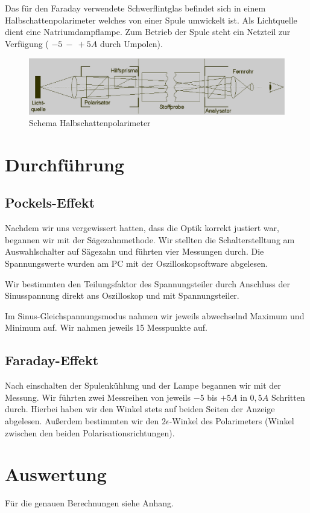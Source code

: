\documentclass[12pt]{article}
\begin{document}
Das für den Faraday verwendete Schwerflintglas befindet sich in einem Halbschattenpolarimeter welches von einer Spule umwickelt ist. Als Lichtquelle dient eine Natriumdampflampe. Zum Betrieb der Spule steht ein Netzteil zur Verfügung ( $-5~-~+5A$ durch Umpolen).

\begin{figure}[H]
\centering
\includegraphics[width=1\linewidth]{pictures/halbschattenpolarimeter.eps}
\caption{Schema Halbschattenpolarimeter}
\end{figure}


\section{Durchführung}
\subsection{Pockels-Effekt}
Nachdem wir uns vergewissert hatten, dass die Optik korrekt justiert war, begannen wir mit der Sägezahnmethode.
Wir stellten die Schalterstelltung am Auswahlschalter auf Sägezahn und führten vier Messungen durch. Die Spannungswerte wurden am PC mit der Oszilloskopsoftware abgelesen.

Wir bestimmten den Teilungsfaktor des Spannungsteiler durch Anschluss der Sinusspannung direkt ans Oszilloskop und mit Spannungsteiler.

Im Sinus-Gleichspannungsmodus nahmen wir jeweils abwechselnd Maximum und Minimum auf. Wir nahmen jeweils 15 Messpunkte auf.

\subsection{Faraday-Effekt}
Nach einschalten der Spulenkühlung und der Lampe begannen wir mit der Messung.
Wir führten zwei Messreihen von jeweils $-5$ bis $+5A$ in $0,5A$ Schritten durch. Hierbei haben wir den Winkel stets auf beiden Seiten der Anzeige abgelesen. Außerdem bestimmten wir den $2\epsilon$-Winkel des Polarimeters (Winkel zwischen den beiden Polarisationsrichtungen).


\section{Auswertung}
Für die genauen Berechnungen siehe Anhang.
\end{document}

